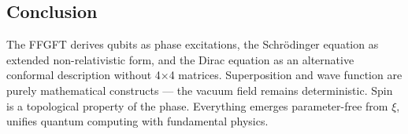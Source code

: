 	\subsection*{Conclusion}
	
	The FFGFT derives qubits as phase excitations, the Schrödinger equation as extended non-relativistic form, and the Dirac equation as an alternative conformal description without 4×4 matrices. Superposition and wave function are purely mathematical constructs — the vacuum field remains deterministic. Spin is a topological property of the phase. Everything emerges parameter-free from \(\xi\), unifies quantum computing with fundamental physics.



